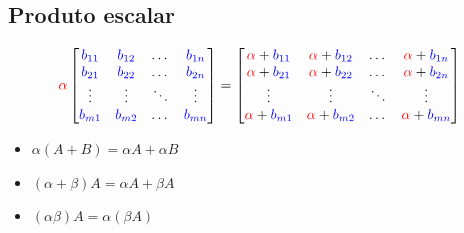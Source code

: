 \documentclass[]{report}
\begin{document}
\subsection{Produto escalar}
$$
\textcolor{red}{\alpha}
\begin{bmatrix}
\color{blue}b_{11} & \color{blue}b_{12} & \dots & \color{blue}b_{1n} \\
\color{blue}b_{21} & \color{blue}b_{22} & \dots & \color{blue}b_{2n} \\
\vdots & \vdots & \ddots & \vdots \\
\color{blue}b_{m1} & \color{blue}b_{m2} & \dots & \color{blue}b_{mn}
\end{bmatrix}
=
\begin{bmatrix}
\textcolor{red}{\alpha}+\textcolor{blue}{b_{11}} & \textcolor{red}{\alpha}+\textcolor{blue}{b_{12}} & \dots & \textcolor{red}{\alpha}+\textcolor{blue}{b_{1n}} \\
\textcolor{red}{\alpha}+\textcolor{blue}{b_{21}} & \textcolor{red}{\alpha}+\textcolor{blue}{b_{22}} & \dots & \textcolor{red}{\alpha}+\textcolor{blue}{b_{2n}} \\
\vdots & \vdots & \ddots & \vdots \\
\textcolor{red}{\alpha}+\textcolor{blue}{b_{m1}} & \textcolor{red}{\alpha}+\textcolor{blue}{b_{m2}} & \dots & \textcolor{red}{\alpha}+\textcolor{blue}{b_{mn}}
\end{bmatrix}$$
\begin{itemize}
\item $\alpha(A+B) = \alpha A + \alpha B$
\item $(\alpha + \beta)A = \alpha A + \beta A$
\item $(\alpha\beta)A = \alpha(\beta A)$
\end{itemize}
\end{document}
